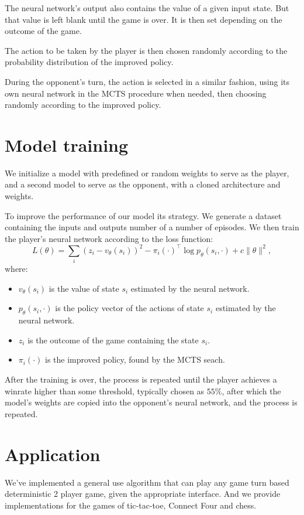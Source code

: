 \documentclass[12pt]{article}
\begin{document}
The neural network's output also contains the value of a given input
state. But that value is left blank until the game is over. It is then set
depending on the outcome of the game.

The action to be taken by the player is then chosen randomly according to the
probability distribution of the improved policy.

During the opponent's turn, the action is selected in a similar fashion, using
its own neural network in the MCTS procedure when needed, then choosing
randomly according to the improved policy.

\section{Model training}
We initialize a model with predefined or random weights to serve as the player,
and a second model to serve as the opponent, with a cloned architecture and
weights.

To improve the performance of our model its strategy. We generate a dataset
containing the inputs and outputs number of a number of episodes. We then
train the player's neural network according to the loss function:
\[
    L(\theta) = \sum_i (z_i - v_{\theta}(s_i))^2 - \pi_i(\cdot)^\top \log p_{\theta}(s_i, \cdot) + c \lVert \theta \rVert^2,
\]
where:
\begin{itemize}
    \item $v_\theta(s_i)$ is the value of state $s_i$ estimated by the neural
        network.
    \item $p_\theta(s_i, \cdot)$ is the policy vector of the actions of state
        $s_i$ estimated by the neural network.
    \item $z_i$ is the outcome of the game containing the state $s_i$.
    \item $\pi_i(\cdot)$ is the improved policy, found by the MCTS seach.
\end{itemize}

After the training is over, the process is repeated until the player achieves
a winrate higher than some threshold, typically chosen as $55\%$, after which
the model's weights are copied into the opponent's neural network, and the
process is repeated.

\section{Application}
We've implemented a general use algorithm that can play any game turn based
deterministic 2 player game, given the appropriate interface. And we provide
implementations for the games of tic-tac-toe, Connect Four and chess.
\end{document}
